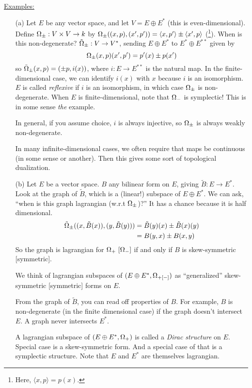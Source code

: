   \underline{Examples:}
  \begin{itemize}
  \item[(a)] Let $E$ be any vector space, and let $V=E\oplus E^*$
  (this is even-dimensional).  Define $\Omega_{\pm}: V\times V\to k$
  by $\Omega_{\pm}((x,p),(x',p')) = \langle x,p'\rangle \pm \langle
  x',p\rangle$ (\footnote{Here, $\langle x,p\rangle = p(x)$.}).
  When is this non-degenerate?  $\tilde {\Omega}_{\pm}:V\to V^*$,
  sending $E\oplus E^*$ to $E^*\oplus E^{**}$ given by
  \[
    \Omega_{\pm}(x,p)(x',p') = p'(x)\pm p(x')
  \]
  so $\tilde {\Omega}_{\pm}(x,p) = (\pm p, i(x))$, where $i:E\to E^{**}$
  is the natural map.  In the finite-dimensional case, we can
  identify $i(x)$ with $x$ because $i$ is an isomorphism.  $E$ is
  called \emph{reflexive} if $i$ is an isomorphism, in which case
  $\Omega_{\pm}$ is non-degenerate.  When $E$ is finite-dimensional,
  note that $\Omega_-$ is symplectic!  This is in some sense
  \emph{the} example.

  In general, if you assume choice, $i$ is always injective, so
  $\Omega_{\pm}$ is always weakly non-degenerate.

  In many infinite-dimensional cases, we often require that maps
  be continuous (in some sense or another).  Then this gives some
  sort of topological dualization.

  \item[(b)] Let $E$ be a vector space.  $B$ any bilinear form on
  $E$, giving $\tilde B:E\to E^*$.  Look at the graph of $\tilde
  B$, which is a (linear!) subspace of $E\oplus E^*$.  We can ask,
  ``when is this graph lagrangian (w.r.t $\Omega_{\pm}$)?''  It has a chance because it
  is half dimensional.
  \begin{align*}
    \tilde {\Omega}_{\pm}((x,\tilde B(x)),(y,\tilde B(y))) &= \tilde
    B(y)(x) \pm \tilde B(x)(y)\\
    & = B(y,x)\pm B(x,y)
  \end{align*}
  So the graph is lagrangian for $\Omega_+\ [\Omega_-]$ if and only if $B$
  is skew-symmetric [symmetric].

  We think of lagrangian subspaces of $(E\oplus E^*,\Omega_{+[-]})$ as
  ``generalized'' skew-symmetric [symmetric] forms on $E$.

  From the graph of $\tilde B$, you can read off properties of
  $B$.  For example, $B$ is non-degenerate (in the finite
  dimensional case) if the graph doesn't intersect $E$.  A graph
  never intersects $E^*$.

  A lagrangian subspace of $(E\oplus E^*,\Omega_+)$ is called a
  \emph{Dirac structure} on $E$.  Special case is a skew-symmetric
  form.  And a special case of that is a symplectic structure.
  Note that $E$ and $E^*$ are themselves lagrangian.


\end{itemize}
